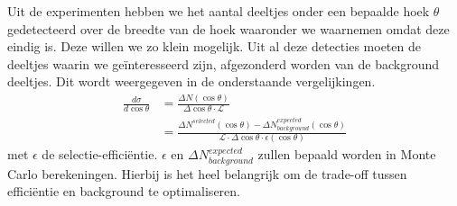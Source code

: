 \documentclass[../main.tex]{subfiles}
\begin{document}
Uit de experimenten hebben we het aantal deeltjes onder een bepaalde hoek $\theta$ gedetecteerd over de breedte van de hoek waaronder we waarnemen omdat deze eindig is. Deze willen we zo klein mogelijk. Uit al deze detecties moeten de deeltjes waarin we geïnteresseerd zijn, afgezonderd worden van de background deeltjes. Dit wordt weergegeven in de onderstaande vergelijkingen.
\begin{equation}
    \begin{aligned}
        \label{eq:measure_cros_sec}
        \frac{d\sigma}{d\cos\theta} &= \frac{\Delta N(\cos\theta)}{\Delta \cos\theta\cdot\mathcal{L}} \\
                                    &= \frac{\Delta N^{selected}(\cos\theta)-\Delta N_{background}^{expected}(\cos\theta)}{\mathcal{L}\cdot\Delta\cos\theta\cdot\epsilon(\cos\theta)} 
    \end{aligned}
\end{equation}
met $\epsilon$ de selectie-efficiëntie. $\epsilon$ en $\Delta N_{background}^{expected}$ zullen bepaald worden in Monte Carlo berekeningen. Hierbij is het heel belangrijk om de trade-off tussen efficiëntie en background te optimaliseren.
\end{document}

